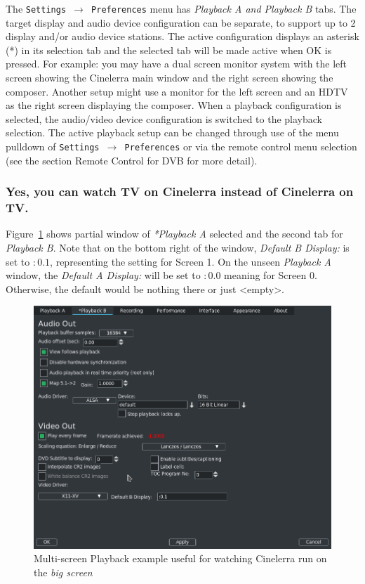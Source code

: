 The \texttt{Settings $\rightarrow$ Preferences} menu has \textit{Playback A and Playback B} tabs.  The target display and audio device configuration can be separate, to support up to 2 display and/or audio device stations.  The active configuration displays an asterisk (*) in its selection tab and the selected tab will be made active when OK is pressed.  For example: you may have a dual screen monitor system with the left screen showing the Cinelerra main window and the right screen showing the composer.  Another setup might use a monitor for the left screen and an HDTV as the right screen displaying the composer.  When a playback configuration is selected, the audio/video device configuration is switched to the playback selection.  The active playback setup can be changed through use of the menu pulldown of \texttt{Settings $\rightarrow$ Preferences} or via the remote control menu selection (see the section Remote Control for DVB for more detail). 

\subsubsection*{Yes, you can watch TV on Cinelerra instead of Cinelerra on TV.}%
\label{ssub:watch_tv_on_cinelerra}

Figure~\ref{fig:multi-screen01} shows partial window of \textit{*Playback A} selected and the second tab for \textit{Playback B}.  Note that on the bottom right of the window, \textit{Default B Display:} is set to $:0.1$, representing the setting for Screen 1.  On the unseen \textit{Playback A} window, the \textit{Default A Display:} will be set to $:0.0$ meaning for Screen 0.  Otherwise, the default would be nothing there or just <empty>.

\begin{figure}[htpb]
    \centering
    \includegraphics[width=0.9\linewidth]{images/multi-screen01.png}
    \caption{Multi-screen Playback example useful for watching Cinelerra run on the \textit{big screen}}
    \label{fig:multi-screen01}
\end{figure}

